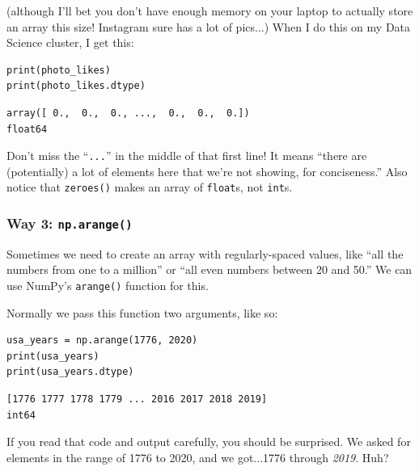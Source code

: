 (although I'll bet you don't have enough memory on your laptop to actually
store an array this size! Instagram sure has a lot of pics...) When I do this
on my Data Science cluster, I get this:

\begin{Verbatim}[fontsize=\small,samepage=true,frame=single,framesep=3mm]
print(photo_likes)
print(photo_likes.dtype)
\end{Verbatim}

\begin{Verbatim}[fontsize=\small,samepage=true,frame=leftline,framesep=5mm,framerule=1mm]
array([ 0.,  0.,  0., ...,  0.,  0.,  0.])
float64
\end{Verbatim}

Don't miss the ``\texttt{...}'' in the middle of that first line! It means
``there are (potentially) a lot of elements here that we're not showing, for
conciseness.'' Also notice that \texttt{zeroes()} makes an array of
\texttt{float}s, not \texttt{int}s.


\subsubsection{Way 3: \texttt{np.arange()}}

Sometimes we need to create an array with regularly-spaced values, like ``all
the numbers from one to a million'' or ``all even numbers between 20 and 50.''
We can use NumPy's \texttt{arange()} function for this.

Normally we pass this function two arguments, like so:

\begin{Verbatim}[fontsize=\small,samepage=true,frame=single,framesep=3mm]
usa_years = np.arange(1776, 2020)
print(usa_years)
print(usa_years.dtype)
\end{Verbatim}

\begin{Verbatim}[fontsize=\small,samepage=true,frame=leftline,framesep=5mm,framerule=1mm]
[1776 1777 1778 1779 ... 2016 2017 2018 2019]
int64
\end{Verbatim}

If you read that code and output carefully, you should be surprised. We asked
for elements in the range of 1776 to 2020, and we got...1776 through
\textit{2019}. Huh?


